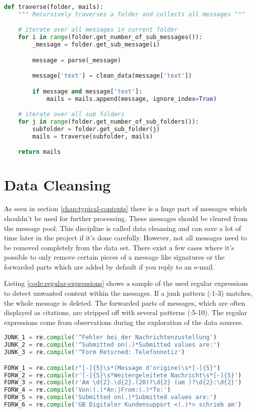 \begin{lstlisting}[language=Python, label={code:traverse}, caption=Recursively traversation of email folders]
def traverse(folder, mails):
    """ Recursively traverses a folder and collects all messages """

    # iterate over all messages in current folder
    for i in range(folder.get_number_of_sub_messages()):
        _message = folder.get_sub_message(i)

        message = parse(_message)

        message['text'] = clean_data(message['text'])

        if message and message['text']:
            mails = mails.append(message, ignore_index=True)

    # iterate over all sub folders
    for j in range(folder.get_number_of_sub_folders()):
        subfolder = folder.get_sub_folder(j)
        mails = traverse(subfolder, mails)

    return mails
\end{lstlisting}

\section{Data Cleansing}
\label{chap:cleansing}

As seen in section \ref{chap:typical-contents} there is a huge part of messages which shouldn't be used for further processing. These messages should be cleared from the message pool. This discipline is called data cleansing and can save a lot of time later in the project if it's done carefully. However, not all messages need to be removed completely from the data set. There exist a few cases where it's possible to only remove certain pieces of a message like signatures or the forwarded parts which are added by default if you reply to an e-mail.

Listing \ref{code:regular-expressions} shows a sample of the used regular expressions to detect unwanted content within the messages. If a junk pattern (:1-3) matches, the whole message is deleted. The forwarded parts of messages, which are often displayed as citations, are stripped off with several patterns (:5-10). The regular expressions come from observations during the exploration of the data sources.

\begin{lstlisting}[language=Python, label={code:regular-expressions}, caption=Regular expressions for junk detection]
JUNK_1 = re.compile('^Fehler bei der Nachrichtenzustellung')
JUNK_2 = re.compile('^Submitted on(.)*Submitted values are:')
JUNK_3 = re.compile('^Form Returned: Telefonnotiz')

FORW_1 = re.compile(r"[-]{5}\s*(Message d'origine)\s*[-]{5}")
FORW_2 = re.compile(r'[-]{5}\s*Weitergeleitete Nachricht\s*[-]{5}')
FORW_3 = re.compile(r'Am \d{2}.\d{2}.(20)?\d{2} (um )?\d{2}:\d{2}')
FORW_4 = re.compile('Von:(.)*An:|From:(.)*To:')
FORW_5 = re.compile('Submitted on(.)*Submitted values are:')
FORW_6 = re.compile('GB Digitaler Kundensupport <(.)*> schrieb am')
\end{lstlisting}

